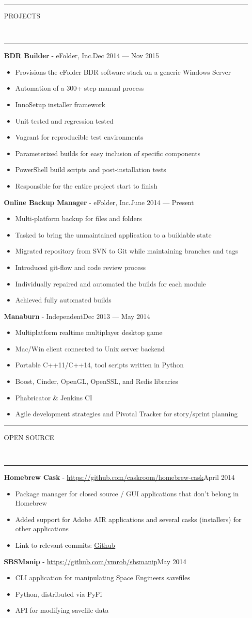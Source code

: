 \documentclass[10pt, letterpaper, oneside]{article}
\newcommand{\HRule}[2]{\textcolor{#1}{\rule{\linewidth}{#2}}}
\newcommand{\sectiontitle}[1]{\begin{minipage}{\textwidth}\HRule{black}{0.25mm}\vspace{-10pt}\begin{center}\Large\MakeUppercase{#1}\end{center}\end{minipage}\\\HRule{light-grey}{0.15mm}\vspace{\baselineskip}}
\newenvironment{ressection}[1]{
  \sectiontitle{#1}}
  {\vspace{0.5\baselineskip}}
\newenvironment{tightressection}[1]{
  \begin{minipage}{\textwidth}
  \sectiontitle{#1}}
  {\vspace{2\baselineskip}\end{minipage}}
\newcommand{\resitem}[1]{
    \vspace{2pt}
    \item \begin{flushleft} #1 \end{flushleft}
}
\newcommand{\resentryheader}[3]{
    \vspace{-5pt}
    \textbf{#1} - #2\hspace{\stretch{1}}\textcolor{light-grey}{#3}\\
}
\newenvironment{resentry}[3]{
  \begin{minipage}{\textwidth}
    \resentryheader{#1}{#2}{#3}
        \vspace{-\baselineskip}
    \begin{itemize}[noitemsep,nolistsep]
}{
    \end{itemize}
        \vspace{\baselineskip}
        \end{minipage}
}
\begin{document}
\begin{ressection}{Projects}
  \begin{resentry}{BDR Builder}{eFolder, Inc.}{Dec 2014 --- Nov 2015}
    \resitem{Provisions the eFolder BDR software stack on a generic Windows Server}
    \resitem{Automation of a 300+ step manual process}
    \resitem{InnoSetup installer framework}
    \resitem{Unit tested and regression tested}
    \resitem{Vagrant for reproducible test environments}
    \resitem{Parameterized builds for easy inclusion of specific components}
    \resitem{PowerShell build scripts and post-installation tests}
    \resitem{Responsible for the entire project start to finish}
  \end{resentry}
  \begin{resentry}{Online Backup Manager}{eFolder, Inc.}{June 2014 --- Present}
    \resitem{Multi-platform backup for files and folders}
    \resitem{Tasked to bring the unmaintained application to a buildable state}
    \resitem{Migrated repository from SVN to Git while maintaining branches and tags}
    \resitem{Introduced git-flow and code review process}
    \resitem{Individually repaired and automated the builds for each module}
    \resitem{Achieved fully automated builds}
  \end{resentry}
  \begin{resentry}{Manaburn}{Independent}{Dec 2013 --- May 2014}
    \resitem{Multiplatform realtime multiplayer desktop game}
    \resitem{Mac/Win client connected to Unix server backend}
    \resitem{Portable C++11/C++14, tool scripts written in Python}
    \resitem{Boost, Cinder, OpenGL, OpenSSL, and Redis libraries}
    \resitem{Phabricator \& Jenkins CI}
    \resitem{Agile development strategies and Pivotal Tracker for story/sprint planning}
  \end{resentry}
\end{ressection}

\begin{tightressection}{Open Source}
  \begin{resentry}{Homebrew Cask}{\href{https://github.com/caskroom/homebrew-cask}{https://github.com/caskroom/homebrew-cask}}{April 2014}
    \resitem{Package manager for closed source / GUI applications that don't belong in Homebrew}
    \resitem{Added support for Adobe AIR applications and several casks (installers) for other applications}
    \resitem{Link to relevant commits: \href{https://github.com/caskroom/homebrew-cask/commits?author=vmrob}{\ul{Github}}}
  \end{resentry}

  \begin{resentry}{SBSManip}{\href{https://github.com/vmrob/sbsmanip}{https://github.com/vmrob/sbsmanip}}{May 2014}
    \resitem{CLI application for manipulating Space Engineers savefiles}
    \resitem{Python, distributed via PyPi}
    \resitem{API for modifying savefile data}
  \end{resentry}
\end{tightressection}
\end{document}
